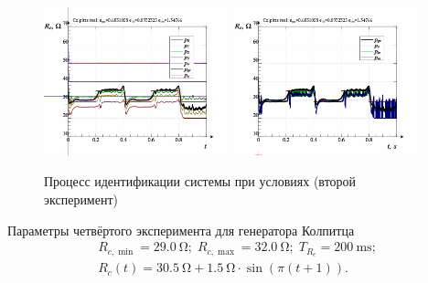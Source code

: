\begin{figure}[htb!]
  \centerline{
    \includegraphics[width=0.48\textwidth]{p/colp_real_id_qi_fv5_1-p_p.png}
    \hfill
    \includegraphics[width=0.48\textwidth]{p/colp_real_id_qi_fv5_1-p_pp.png}
  }
  \caption{Процесс идентификации системы  при условиях (второй эксперимент)}
  \label{atu:f:colp_real_id_qi_fv5_1}
\end{figure}


Параметры четвёртого эксперимента для генератора Колпитца
%
\begin{equation}
  \begin{array}{c}
    R_{c,\min} = \SI{29.0}{\ohm};
    \;
    R_{c,\max} = \SI{32.0}{\ohm};
    \;
    T_{R_c} = \SI{200}{\milli\second};
  \\
    R_c(t) = \SI{30.5}{\ohm} + \SI{1.5}{\ohm} \cdot \sin( \pi ( t + 1 ) ).
  \end{array}
  \label{atu:eq:colp_test4_cond}
\end{equation}

